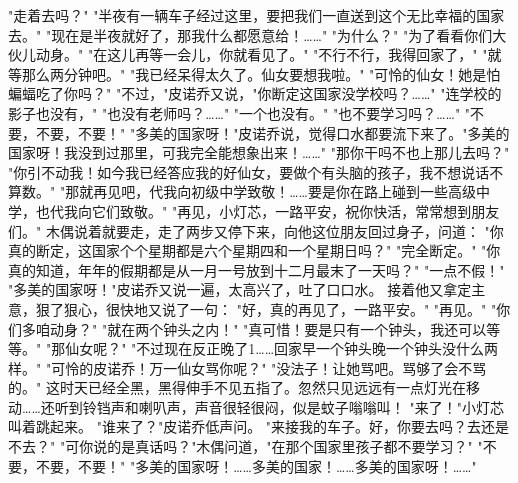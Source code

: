 \documentclass[12pt,UTF8]{ctexbook}
\begin{document}
"走着去吗？"
"半夜有一辆车子经过这里，要把我们一直送到这个无比幸福的国家去。"
"现在是半夜就好了，那我什么都愿意给！……"
"为什么？"
"为了看看你们大伙儿动身。"
"在这儿再等一会儿，你就看见了。"
"不行不行，我得回家了，"
"就等那么两分钟吧。"
"我已经呆得太久了。仙女要想我啦。"
"可怜的仙女！她是怕蝙蝠吃了你吗？"
"不过，"皮诺乔又说，"你断定这国家没学校吗？……"
"连学校的影子也没有，"
"也没有老师吗？……"
"一个也没有。"
"也不要学习吗？……"
"不要，不要，不要！"
"多美的国家呀！"皮诺乔说，觉得口水都要流下来了。"多美的国家呀！我没到过那里，可我完全能想象出来！……"
"那你干吗不也上那儿去吗？"
"你引不动我！如今我已经答应我的好仙女，要做个有头脑的孩子，我不想说话不算数。"
"那就再见吧，代我向初级中学致敬！……要是你在路上碰到一些高级中学，也代我向它们致敬。"
"再见，小灯芯，一路平安，祝你快活，常常想到朋友们。"
木偶说着就要走，走了两步又停下来，向他这位朋友回过身子，问道：
"你真的断定，这国家个个星期都是六个星期四和一个星期日吗？"
"完全断定。"
"你真的知道，年年的假期都是从一月一号放到十二月最末了一天吗？"
"一点不假！"
"多美的国家呀！"皮诺乔又说一遍，太高兴了，吐了口口水。
接着他又拿定主意，狠了狠心，很快地又说了一句：
"好，真的再见了，一路平安。"
"再见。"
"你们多咱动身？"
"就在两个钟头之内！"
"真可惜！要是只有一个钟头，我还可以等等。"
"那仙女呢？"
"不过现在反正晚了1……回家早一个钟头晚一个钟头没什么两样。"
"可怜的皮诺乔！万一仙女骂你呢？"
"没法子！让她骂吧。骂够了会不骂的。"
这时天已经全黑，黑得伸手不见五指了。忽然只见远远有一点灯光在移动……还听到铃铛声和喇叭声，声音很轻很闷，似是蚊子嗡嗡叫！
"来了！"小灯芯叫着跳起来。
"谁来了？"皮诺乔低声问。
"来接我的车子。好，你要去吗？去还是不去？"
"可你说的是真话吗？"木偶问道，"在那个国家里孩子都不要学习？"
"不要，不要，不要！"
"多美的国家呀！……多美的国家！……多美的国家呀！……"

\chapter{}
\end{document}

